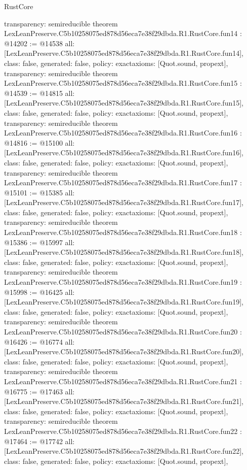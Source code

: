 \begin{lexlean}{RustCore}
\begin{coremodule}
{  transparency: semireducible
}
theorem LexLeanPreserve.C5b10258075ed878d56eca7e38f29dbda.R1.RustCore.fun14 : @14202 := @14538 {
  all: [LexLeanPreserve.C5b10258075ed878d56eca7e38f29dbda.R1.RustCore.fun14],
  class: false,
  generated: false,
  policy: exact{axioms: [Quot.sound, propext]},
  transparency: semireducible
}
theorem LexLeanPreserve.C5b10258075ed878d56eca7e38f29dbda.R1.RustCore.fun15 : @14539 := @14815 {
  all: [LexLeanPreserve.C5b10258075ed878d56eca7e38f29dbda.R1.RustCore.fun15],
  class: false,
  generated: false,
  policy: exact{axioms: [Quot.sound, propext]},
  transparency: semireducible
}
theorem LexLeanPreserve.C5b10258075ed878d56eca7e38f29dbda.R1.RustCore.fun16 : @14816 := @15100 {
  all: [LexLeanPreserve.C5b10258075ed878d56eca7e38f29dbda.R1.RustCore.fun16],
  class: false,
  generated: false,
  policy: exact{axioms: [Quot.sound, propext]},
  transparency: semireducible
}
theorem LexLeanPreserve.C5b10258075ed878d56eca7e38f29dbda.R1.RustCore.fun17 : @15101 := @15385 {
  all: [LexLeanPreserve.C5b10258075ed878d56eca7e38f29dbda.R1.RustCore.fun17],
  class: false,
  generated: false,
  policy: exact{axioms: [Quot.sound, propext]},
  transparency: semireducible
}
theorem LexLeanPreserve.C5b10258075ed878d56eca7e38f29dbda.R1.RustCore.fun18 : @15386 := @15997 {
  all: [LexLeanPreserve.C5b10258075ed878d56eca7e38f29dbda.R1.RustCore.fun18],
  class: false,
  generated: false,
  policy: exact{axioms: [Quot.sound, propext]},
  transparency: semireducible
}
theorem LexLeanPreserve.C5b10258075ed878d56eca7e38f29dbda.R1.RustCore.fun19 : @15998 := @16425 {
  all: [LexLeanPreserve.C5b10258075ed878d56eca7e38f29dbda.R1.RustCore.fun19],
  class: false,
  generated: false,
  policy: exact{axioms: [Quot.sound, propext]},
  transparency: semireducible
}
theorem LexLeanPreserve.C5b10258075ed878d56eca7e38f29dbda.R1.RustCore.fun20 : @16426 := @16774 {
  all: [LexLeanPreserve.C5b10258075ed878d56eca7e38f29dbda.R1.RustCore.fun20],
  class: false,
  generated: false,
  policy: exact{axioms: [Quot.sound, propext]},
  transparency: semireducible
}
theorem LexLeanPreserve.C5b10258075ed878d56eca7e38f29dbda.R1.RustCore.fun21 : @16775 := @17463 {
  all: [LexLeanPreserve.C5b10258075ed878d56eca7e38f29dbda.R1.RustCore.fun21],
  class: false,
  generated: false,
  policy: exact{axioms: [Quot.sound, propext]},
  transparency: semireducible
}
theorem LexLeanPreserve.C5b10258075ed878d56eca7e38f29dbda.R1.RustCore.fun22 : @17464 := @17742 {
  all: [LexLeanPreserve.C5b10258075ed878d56eca7e38f29dbda.R1.RustCore.fun22],
  class: false,
  generated: false,
  policy: exact{axioms: [Quot.sound, propext]},
}
\end{coremodule}
\end{lexlean}
